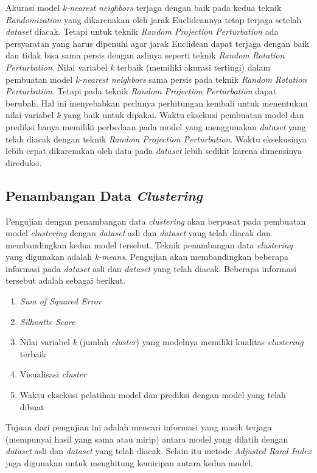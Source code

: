 Akurasi model \textit{k-nearest neighbors} terjaga dengan baik pada kedua teknik \textit{Randomization} yang dikarenakan oleh jarak Euclideannya tetap terjaga setelah \textit{dataset} diacak. Tetapi untuk teknik \textit{Random Projection Perturbation} ada persyaratan yang harus dipenuhi agar jarak Euclidean dapat terjaga dengan baik dan tidak bisa sama persis dengan aslinya seperti teknik \textit{Random Rotation Perturbation}. Nilai variabel \textit{k} terbaik (memiliki akurasi tertingi) dalam pembuatan model \textit{k-nearest neighbors} sama persis pada teknik \textit{Random Rotation Perturbation}. Tetapi pada teknik \textit{Random Projection Perturbation} dapat berubah. Hal ini menyebabkan perlunya perhitungan kembali untuk menentukan nilai variabel \textit{k} yang baik untuk dipakai. Waktu eksekusi pembuatan model dan prediksi hanya memiliki perbedaan pada model yang menggunakan \textit{dataset} yang telah diacak dengan teknik \textit{Random Projection Perturbation}. Waktu eksekusinya lebih cepat dikarenakan oleh data pada \textit{dataset} lebih sedikit karena dimensinya direduksi.

\subsection{Penambangan Data \textit{Clustering}}
\label{subsec:pengujian-clustering}

Pengujian dengan penambangan data \textit{clustering} akan berpusat pada pembuatan model \textit{clustering} dengan \textit{dataset} asli dan \textit{dataset} yang telah diacak dan membandingkan kedua model tersebut. Teknik penambangan data \textit{clustering} yang digunakan adalah \textit{k-means}. Pengujian akan membandingkan beberapa informasi pada \textit{dataset} asli dan \textit{dataset} yang telah diacak. Beberapa informasi tersebut adalah sebagai berikut.
\begin{enumerate}
	\item \textit{Sum of Squared Error}
	\item \textit{Silhoutte Score}
	\item Nilai variabel \textit{k} (jumlah \textit{cluster}) yang modelnya memiliki kualitas \textit{clustering} terbaik
	\item Visualisasi \textit{cluster}
	\item Waktu eksekusi pelatihan model dan prediksi dengan model yang telah dibuat
\end{enumerate}
Tujuan dari pengujian ini adalah mencari informasi yang masih terjaga (mempunyai hasil yang sama atau mirip) antara model yang dilatih dengan \textit{dataset} asli dan \textit{dataset} yang telah diacak. Selain itu metode \textit{Adjusted Rand Index} juga digunakan untuk menghitung kemiripan antara kedua model.

